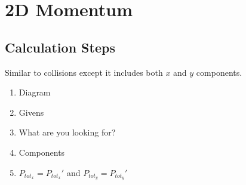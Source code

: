 \documentclass{article}
\begin{document}
\section{2D Momentum}
\begin{adjustwidth}{1cm}{0pt}
    \subsection*{Calculation Steps}
    \begin{flushleft}
        Similar to collisions except it includes both $x$ and $y$ components.
    \end{flushleft}
    \vspace*{5pt}
    \begin{adjustwidth}{0.5cm}{0pt}
        \begin{enumerate}
            \item Diagram
            \item Givens
            \item What are you looking for?
            \item Components
            \item $P_{tot_{x}} = P_{tot_{x}}\prime$ and $P_{tot_{y}} = P_{tot_{y}}\prime$
        \end{enumerate}
    \end{adjustwidth}
\end{adjustwidth}
\end{document}
